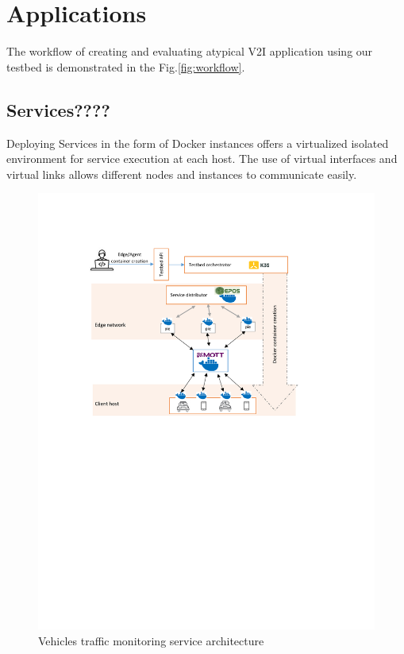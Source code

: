 \documentclass[conference]{IEEEtran}
\begin{document}
\section{Applications}
\par The workflow of creating and evaluating atypical V2I application using our testbed is demonstrated in the Fig.\ref{fig:workflow}.


\subsection{Services????}
\par Deploying Services in the form of Docker instances offers a virtualized isolated environment for service execution at each host. The use of virtual interfaces and virtual links allows different nodes and instances to communicate easily.
\begin{figure}[!htbp]
\centering
\includegraphics[clip, trim=3.3cm 13.7cm 4.5cm 3.5cm, width=\columnwidth]{figures/app1.pdf}
\caption{Vehicles traffic monitoring service architecture}
\label{fig:imp}
\end{figure}
\end{document}
